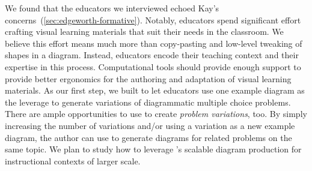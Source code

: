 We found that the educators we interviewed echoed Kay's concerns~(\cref{sec:edgeworth-formative}). Notably, educators spend significant effort crafting visual learning materials that suit their needs in the classroom. We believe this effort means much more than copy-pasting and low-level tweaking of shapes in a diagram. Instead, educators encode their teaching context and their expertise in this process. Computational tools should provide enough support to provide better ergonomics for the authoring and adaptation of visual learning materials. As our first step, we built \Edgeworth to let educators use one example diagram as the leverage to generate variations of diagrammatic multiple choice problems. There are ample opportunities to use \Edgeworth to create \textit{problem variations}, too. By simply increasing the number of variations and/or using a variation as a new example diagram, the author can use \Edgeworth to generate diagrams for related problems on the same topic. We plan to study how to leverage \Edgeworth's scalable diagram production for instructional contexts of larger scale.
